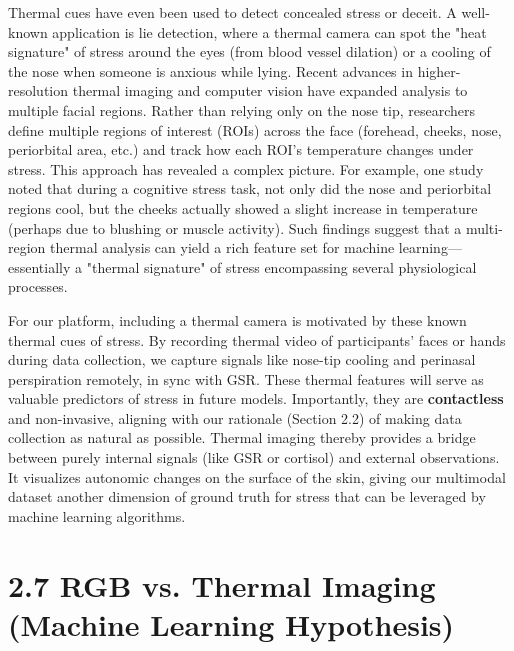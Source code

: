 \documentclass[11pt,a4paper]{report}
\begin{document}
Thermal cues have even been used to detect concealed stress or deceit. A well-known application is lie detection, where a thermal camera can spot the "heat signature" of stress around the eyes (from blood vessel dilation) or a cooling of the nose when someone is anxious while lying. Recent advances in higher-resolution thermal imaging and computer vision have expanded analysis to multiple facial regions. Rather than relying only on the nose tip, researchers define multiple regions of interest (ROIs) across the face (forehead, cheeks, nose, periorbital area, etc.) and track how each ROI's temperature changes under stress\cite{ContactlessStressThermal2022}. This approach has revealed a complex picture. For example, one study noted that during a cognitive stress task, not only did the nose and periorbital regions cool, but the cheeks actually showed a slight increase in temperature (perhaps due to blushing or muscle activity)\cite{ContactlessStressThermal2022}. Such findings suggest that a multi-region thermal analysis can yield a rich feature set for machine learning—essentially a "thermal signature" of stress encompassing several physiological processes.

For our platform, including a thermal camera is motivated by these known thermal cues of stress. By recording thermal video of participants' faces or hands during data collection, we capture signals like nose-tip cooling and perinasal perspiration remotely, in sync with GSR. These thermal features will serve as valuable predictors of stress in future models. Importantly, they are \textbf{contactless} and non-invasive, aligning with our rationale (Section 2.2) of making data collection as natural as possible. Thermal imaging thereby provides a bridge between purely internal signals (like GSR or cortisol) and external observations. It visualizes autonomic changes on the surface of the skin, giving our multimodal dataset another dimension of ground truth for stress that can be leveraged by machine learning algorithms.

\section{2.7 RGB vs. Thermal Imaging (Machine Learning Hypothesis)}
\end{document}
